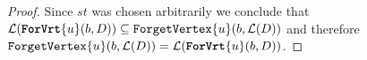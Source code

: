 \begin{proof}
    Since $st$ was chosen arbitrarily we conclude that $\mathcal{L}(\texttt{\textbf{ForVrt}}\{u\}(b,D)) \subseteq \texttt{ForgetVertex}\{u\}(b,\mathcal{L}(D))$ and therefore $\texttt{ForgetVertex}\{u\}(b, \mathcal{L}(D)) = \mathcal{L}(\texttt{\textbf{ForVrt}}\{u\}(b, D))$.
\end{proof}




